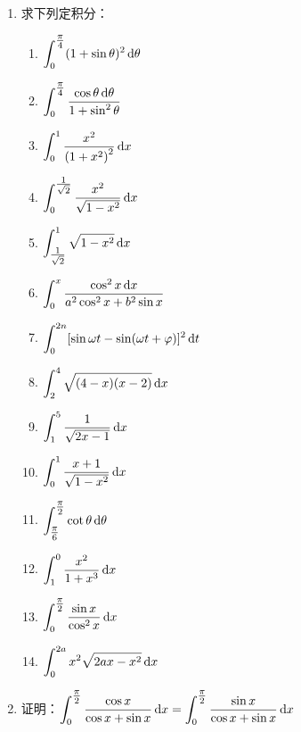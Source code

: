 \begin{ex}
\begin{enumerate}
    \item 求下列定积分：
\begin{multicols}{2}
\begin{enumerate}
    \item $\displaystyle\int_{0}^{\tfrac{\pi}{4}}(1+\sin \theta)^{2} \,{\rm d} \theta $ 
    \item $\displaystyle\int_{0}^{\tfrac{\pi}{4}} \dfrac{\cos \theta \,{\rm d} \theta}{1+\sin ^{2} \theta}$
    \item $\displaystyle\int_{0}^{1} \dfrac{x^{2}}{\left(1+x^{2}\right)^{2}} \,{\rm d} x$
    \item $\displaystyle\int_{0}^{\tfrac{1}{\sqrt{2}}} \dfrac{x^{2}}{\sqrt{1-x^{2}}} \,{\rm d} x$
    \item $\displaystyle\int_{\tfrac{1}{\sqrt{2}}}^{1} \sqrt{1-x^{2}} \,{\rm d} x$
    \item $\displaystyle\int_{0}^{x} \dfrac{\cos ^{2} x \,{\rm d} x}{a^{2} \cos ^{2} x+b^{2} \sin x}$
    \item $\displaystyle\int_{0}^{2 n}[\sin \omega t -\sin (\omega t+\varphi)]^{2} \,{\rm d} t$
    \item $\displaystyle\int_{2}^{4} \sqrt{(4-x)(x-2)} \,{\rm d} x$
    \item $\displaystyle\int_{1}^{5} \dfrac{1}{\sqrt{2 x-1}} \,{\rm d} x$ 
    \item $\displaystyle\int_{0}^{1} \dfrac{x+1}{\sqrt{1 - x^{2}}} \,{\rm d} x$
    \item $\displaystyle\int_{\tfrac{\pi}{6}}^{\tfrac{\pi}{2}} \cot \theta \,{\rm d} \theta$
    \item $\displaystyle\int_{1}^{0} \dfrac{x^{2}}{ 1+x^{3}} \,{\rm d} x$
    \item $\displaystyle\int^{\tfrac{\pi}{2}}_0 \dfrac{\sin x}{\cos^2 x}\,{\rm d} x$
    \item $\displaystyle\int^{2a}_0 x^2\sqrt{2ax-x^2}\,{\rm d} x$
\end{enumerate}
\end{multicols}

\item 证明：$\displaystyle\int^{\tfrac{\pi}{2}}_0 \dfrac{\cos x}{\cos x+\sin x}\,{\rm d} x=\displaystyle\int^{\tfrac{\pi}{2}}_0 \dfrac{\sin x}{\cos x+\sin x}\,{\rm d} x$


\end{enumerate}
\end{ex}
